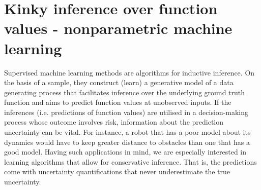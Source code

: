 \section{Kinky inference over function values - nonparametric machine learning}
Supervised machine learning methods are algorithms for inductive inference. On the basis of a sample, they construct (learn) a generative model of a data generating process that facilitates inference over the underlying ground truth function and aims to predict function values at unobserved inputs. If the inferences (i.e. predictions of function values) are utilised in a decision-making process whose outcome involves risk, information about the prediction uncertainty can be vital. For instance, a robot that has a poor model about its dynamics would have to keep greater distance to obstacles than one that has a good model. Having such applications in mind, we are especially interested in learning algorithms that allow for conservative inference. That is, the predictions come with uncertainty quantifications that never underestimate the true uncertainty. 

